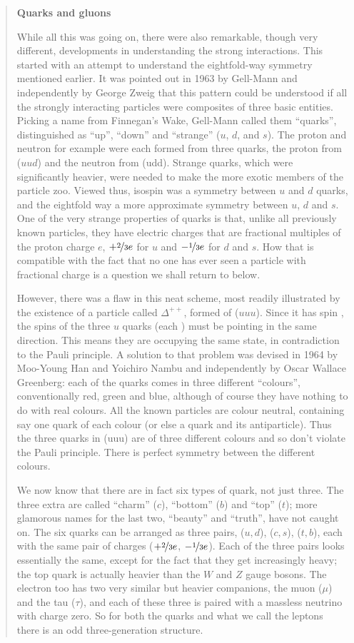 \begin{quote}
\textbf{Quarks and gluons}

While all this was going on, there were also remarkable, though very different, developments in understanding the strong interactions. This started with an attempt to understand the eightfold-way symmetry mentioned earlier. It was pointed out in 1963 by Gell-Mann and independently by George Zweig that this pattern could be understood if all the strongly interacting particles were composites of three basic entities. Picking a name from Finnegan’s Wake, Gell-Mann called them “quarks”, distinguished as “up”, “down” and “strange” ($u$, $d$, and $s$). The proton and neutron for example were each formed from three quarks, the proton from ($uud$) and the neutron from (udd). Strange quarks, which were significantly heavier, were needed to make the more exotic members of the particle zoo. Viewed thus, isospin was a symmetry between $u$ and $d$ quarks, and the eightfold way a more approximate symmetry between $u$, $d$ and $s$. One of the very strange properties of quarks is that, unlike all previously known particles, they have electric charges that are fractional multiples of the proton charge $e$, $+ \nicefrac{2}{3} e$ for $u$ and $-\nicefrac{1}{3} e$ for $d$ and $s$. How that is compatible with the fact that no one has ever seen a particle with fractional charge is a question we shall return to below.

However, there was a flaw in this neat scheme, most readily illustrated by the existence of a particle called $\Delta^{++}$, formed of ($uuu$). Since it has spin  , the spins of the three $u$ quarks (each ) must be pointing in the same direction. This means they are occupying the same state, in contradiction to the Pauli principle. A solution to that problem was devised in 1964 by Moo-Young Han and Yoichiro Nambu and independently by Oscar Wallace Greenberg: each of the quarks comes in three different “colours”, conventionally red, green and blue, although of course they have nothing to do with real colours. All the known particles are colour neutral, containing say one quark of each colour (or else a quark and its antiparticle). Thus the three quarks in (uuu) are of three different colours and so don’t violate the Pauli principle. There is perfect symmetry between the different colours.

We now know that there are in fact six types of quark, not just three. The three extra are called “charm” ($c$), “bottom” ($b$) and “top” ($t$); more glamorous names for the last two, “beauty” and “truth”, have not caught on. The six quarks can be arranged as three pairs, ($u,d$), ($c,s$), ($t,b$), each with the same pair of charges ($+ \nicefrac{2}{3} e$, $- \nicefrac{1}{3} e$). Each of the three pairs looks essentially the same, except for the fact that they get increasingly heavy; the top quark is actually heavier than the $W$ and $Z$ gauge bosons. The electron too has two very similar but heavier companions, the muon ($\mu$) and the tau ($\tau$), and each of these three is paired with a massless neutrino with charge zero. So for both the quarks and what we call the leptons there is an odd three-generation structure.


\end{quote}
